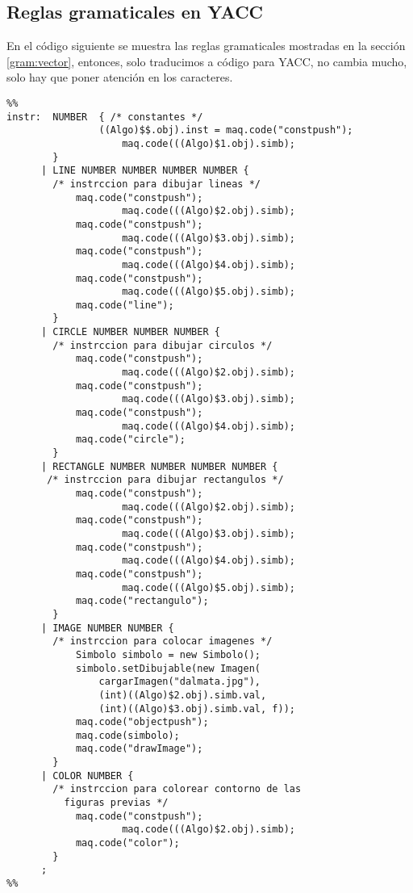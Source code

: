 \subsection{Reglas gramaticales en YACC}
En el código siguiente se muestra las reglas gramaticales mostradas en la
sección \ref{gram:vector}, entonces, solo traducimos a código para YACC, 
no cambia mucho, solo hay que poner atención en los caracteres.
\begin{lstlisting}
%%
instr:  NUMBER  { /* constantes */
    			((Algo)$$.obj).inst = maq.code("constpush");
	                maq.code(((Algo)$1.obj).simb); 
		}
      | LINE NUMBER NUMBER NUMBER NUMBER { 
      	/* instrccion para dibujar lineas */
			maq.code("constpush");
                	maq.code(((Algo)$2.obj).simb); 
			maq.code("constpush");
                	maq.code(((Algo)$3.obj).simb); 
			maq.code("constpush");
                	maq.code(((Algo)$4.obj).simb); 
			maq.code("constpush");
                	maq.code(((Algo)$5.obj).simb); 
			maq.code("line");
		}
      | CIRCLE NUMBER NUMBER NUMBER { 
      	/* instrccion para dibujar circulos */
			maq.code("constpush");
                	maq.code(((Algo)$2.obj).simb);
			maq.code("constpush");
                	maq.code(((Algo)$3.obj).simb);
			maq.code("constpush");
                	maq.code(((Algo)$4.obj).simb);
			maq.code("circle");
		}
      | RECTANGLE NUMBER NUMBER NUMBER NUMBER { 
	   /* instrccion para dibujar rectangulos */
			maq.code("constpush");
                	maq.code(((Algo)$2.obj).simb); 
			maq.code("constpush");
                	maq.code(((Algo)$3.obj).simb); 
			maq.code("constpush");
                	maq.code(((Algo)$4.obj).simb); 
			maq.code("constpush");
                	maq.code(((Algo)$5.obj).simb); 
			maq.code("rectangulo");
		}
      | IMAGE NUMBER NUMBER { 
      	/* instrccion para colocar imagenes */
			Simbolo simbolo = new Simbolo();
			simbolo.setDibujable(new Imagen(
				cargarImagen("dalmata.jpg"),
				(int)((Algo)$2.obj).simb.val, 
				(int)((Algo)$3.obj).simb.val, f));
			maq.code("objectpush");
			maq.code(simbolo);
			maq.code("drawImage");
		}
      | COLOR NUMBER { 
      	/* instrccion para colorear contorno de las 
      	  figuras previas */
			maq.code("constpush");
	                maq.code(((Algo)$2.obj).simb); 
			maq.code("color");
		}
      ;
%%
\end{lstlisting}

